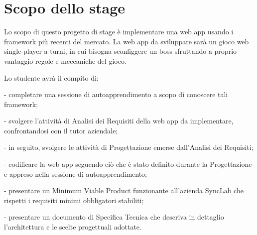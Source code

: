 \section*{Scopo dello stage}
Lo scopo di questo progetto di stage è implementare una web app usando i framework più recenti del mercato.
La web app da sviluppare sarà un gioco web single-player a turni, in cui bisogna sconfiggere un boss sfruttando a proprio vantaggio regole e meccaniche del gioco.

Lo studente avrà il compito di:

- completare una sessione di autoapprendimento a scopo di conoscere tali framework;

- svolgere l'attività di Analisi dei Requisiti della web app da implementare, confrontandosi con il tutor aziendale;

- in seguito, svolgere le attività di Progettazione emerse dall'Analisi dei Requisiti;

- codificare la web app seguendo ciò che è stato definito durante la Progettazione e appreso nella sessione di autoapprendimento;

- presentare un Minimum Viable Product funzionante all'azienda SyncLab che rispetti i requisiti minimi obbligatori stabiliti;

- presentare un documento di Specifica Tecnica che descriva in dettaglio l'architettura e le scelte progettuali adottate.